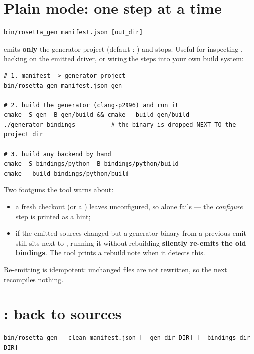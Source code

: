 \section{Plain mode: one step at a time}

\begin{lstlisting}[style=sh]
bin/rosetta_gen manifest.json [out_dir]
\end{lstlisting}

emits \textbf{only} the generator project (default :
) and stops. Useful for inspecting
, hacking on the emitted driver, or wiring the steps into your
own build system:

\begin{lstlisting}[style=sh]
# 1. manifest -> generator project
bin/rosetta_gen manifest.json gen

# 2. build the generator (clang-p2996) and run it
cmake -S gen -B gen/build && cmake --build gen/build
./generator bindings          # the binary is dropped NEXT TO the project dir

# 3. build any backend by hand
cmake -S bindings/python -B bindings/python/build
cmake --build bindings/python/build
\end{lstlisting}

Two footguns the tool warns about:

\begin{itemize}
  \item a fresh checkout (or a ) leaves 
    unconfigured, so  alone fails --- the \emph{configure}
    step is printed as a  hint;
  \item if the emitted sources changed but a generator binary from a previous
    emit still sits next to , running it without rebuilding
    \textbf{silently re-emits the old bindings}. The tool prints a rebuild note
    when it detects this.
\end{itemize}

Re-emitting is idempotent: unchanged files are not rewritten, so the next
 recompiles nothing.

\section{: back to sources}

\begin{lstlisting}[style=sh]
bin/rosetta_gen --clean manifest.json [--gen-dir DIR] [--bindings-dir DIR]
\end{lstlisting}

